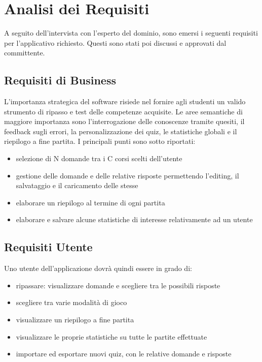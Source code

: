 

\chapter{Analisi dei Requisiti}
A seguito dell'intervista con l'esperto del dominio, sono emersi i seguenti requisiti per l'applicativo richiesto. Questi sono stati poi discussi e approvati dal committente.
\section{Requisiti di Business}
    L'importanza strategica del software risiede nel fornire agli studenti un valido strumento di ripasso e test delle competenze acquisite.
    Le aree semantiche di maggiore importanza sono l'interrogazione delle conoscenze tramite quesiti, il feedback sugli errori, la personalizzazione dei quiz, le statistiche globali e il riepilogo a fine partita. 
    I principali punti sono sotto riportati:
    \begin{itemize}
        \item selezione di N domande tra i C corsi scelti dell'utente
        \item gestione delle domande e delle relative risposte permettendo l'editing, il salvataggio e il caricamento delle stesse
        \item elaborare un riepilogo al termine di ogni partita
        \item elaborare e salvare alcune statistiche di interesse relativamente ad un utente
    \end{itemize}
	
\section{Requisiti Utente}
    Uno utente dell'applicazione dovrà quindi essere in grado di:
    \begin{itemize}
        \item ripassare: visualizzare domande e scegliere tra le possibili risposte
        \item scegliere tra varie modalità di gioco
        \item visualizzare un riepilogo a fine partita
        \item visualizzare le proprie statistiche su tutte le partite effettuate
        \item importare ed esportare nuovi quiz, con le relative domande e risposte
    \end{itemize}
 
